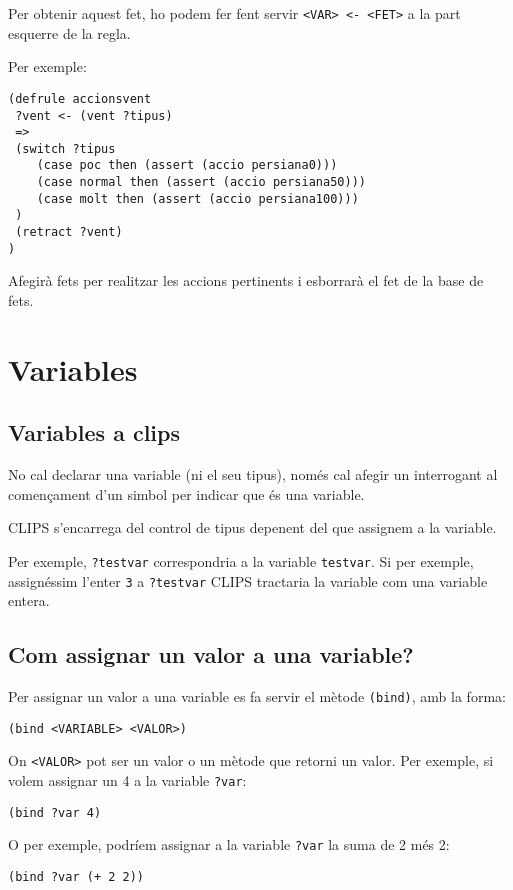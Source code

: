 \documentclass[11pt,svgnames]{scrbook}
\begin{document}
Per obtenir aquest fet, ho podem fer fent servir \texttt{<VAR> <- <FET>} a la
part esquerre de la regla.

Per exemple:

\begin{verbatim}
(defrule accionsvent
 ?vent <- (vent ?tipus)
 =>
 (switch ?tipus
    (case poc then (assert (accio persiana0)))
    (case normal then (assert (accio persiana50)))
    (case molt then (assert (accio persiana100)))
 )
 (retract ?vent)
)
\end{verbatim}

Afegirà fets per realitzar les accions pertinents i esborrarà el fet de la base
de fets.


\section{Variables}
\subsection{Variables a clips}


No cal declarar una variable (ni el seu tipus), només cal afegir un interrogant
al començament d'un simbol per indicar que és una variable.

CLIPS s'encarrega del control de tipus depenent del que assignem a la variable.

Per exemple, \texttt{?testvar} correspondria a la variable \texttt{testvar}. Si
per exemple, assignéssim l'enter \texttt{3} a \texttt{?testvar} CLIPS tractaria
la variable com una variable entera.

\subsection{Com assignar un valor a una variable?}


Per assignar un valor a una variable es fa servir el mètode \texttt{(bind)}, amb
la forma:
\medskip

\texttt{(bind <VARIABLE> <VALOR>)}
\medskip

On \texttt{<VALOR>} pot ser un valor o un mètode que retorni un valor.
Per exemple, si volem assignar un 4 a la variable \texttt{?var}:
\medskip

\texttt{(bind ?var 4)}
\medskip

O per exemple, podríem assignar a la variable \texttt{?var} la suma de 2 més 2:
\medskip

\texttt{(bind ?var (+ 2 2)) }
\end{document}
